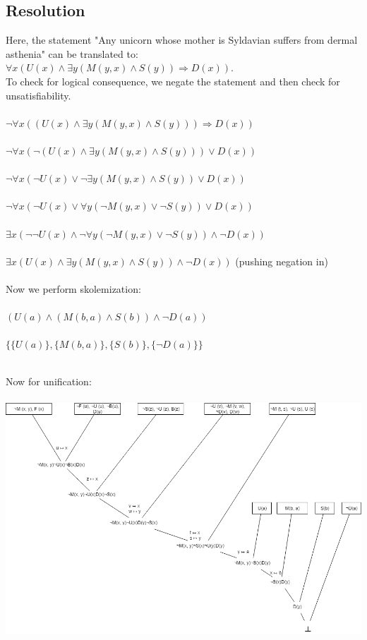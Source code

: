 \documentclass[12pt]{article}
\newcommand{\impl}{\mathbin{\Rightarrow}}
\newcommand\tab[1][1cm]{\hspace*{#1}}
\begin{document}
\subsection*{Resolution}
Here, the statement "Any unicorn whose mother is Syldavian suffers from dermal asthenia" can be translated to: $\forall x (U(x) \land \exists y (M(y, x) \land S(y)) \impl D(x))$. \\
To check for logical consequence, we negate the statement and then check for unsatisfiability.\\\\
$\neg \forall x ((U(x) \land \exists y (M(y, x) \land S(y))) \impl D(x))$ \\\\
$\neg \forall x (\neg (U(x) \land \exists y (M(y, x) \land S(y))) \lor D(x))$ \\\\
$\neg \forall x (\neg U(x) \lor \neg \exists y (M(y, x) \land S(y)) \lor D(x))$ \\\\
$\neg \forall x (\neg U(x) \lor \forall y (\neg M(y, x) \lor \neg S(y)) \lor D(x))$ \\\\
$\exists x (\neg\neg U(x) \land \neg\forall y (\neg M(y, x) \lor \neg S(y)) \land \neg D(x))$ \\\\
$\exists x (U(x) \land \exists y (M(y, x) \land S(y)) \land \neg D(x))$ \tab (pushing negation in)\\\\

Now we perform skolemization:\\\\
$(U(a) \land (M(b, a) \land S(b)) \land \neg D(a))$ \\\\
$\{\{U(a)\}, \{M(b, a)\}, \{S(b)\}, \{\neg D(a)\}\}$\\\\

\pagebreak

Now for unification:\\\\
\includegraphics[width=\textwidth]{4}
\end{document}
